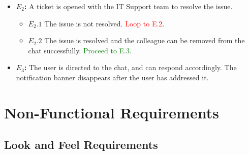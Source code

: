 \documentclass[]{article}
\begin{document}
\begin{enumerate}[\bf {BE}11.]
{{\begin{itemize}
                    \item {\bf $E_{2}$:}  A ticket is opened with the IT Support team to resolve the issue.
                    \begin{itemize}
                        \item {\bf $E_{2}.1$} The issue is not resolved. \textcolor{red}{Loop to E.2}.
                        \item {\bf $E_{2}.2$} The issue is resolved and the colleague can be removed from the chat successfully. \textcolor{green}{Proceed to E.3}.
                    \end{itemize}
					\item {\bf $E_{3}$:}  The user is directed to the chat, and can respond accordingly. The notification banner disappears after the user has addressed it.
			\end{itemize}
				
			}%
		}%
		\end{enumerate}
		

\section{Non-Functional Requirements}
\label{sec:non-functional_requirements}

\subsection{Look and Feel Requirements}
\label{sub:look_and_feel_requirements}
\end{document}
